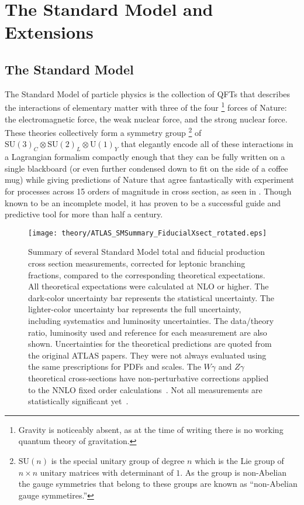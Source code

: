 \chapter{The Standard Model and Extensions}\label{chapter:theory}

\section{The Standard Model}\label{section:standard_model}

The Standard Model of particle physics is the collection of \glspl{QFT} that describes the interactions of elementary matter with three of the four%
\footnote{Gravity is noticeably absent, as at the time of writing there is no working quantum theory of gravitation.}
forces of Nature: the electromagnetic force, the weak nuclear force, and the strong nuclear force.
These theories collectively form a symmetry group%
\footnote{$\mathrm{SU}(n)$ is the special unitary group of degree $n$ which is the Lie group  of $n\times n$ unitary matrices with determinant of $1$.
 As the group is non-Abelian the gauge symmetries that belong to these groups are known as ``non-Abelian gauge symmetires.''}
of $\mathrm{SU}(3)_{C} \otimes \mathrm{SU}(2)_{L} \otimes \mathrm{U}(1)_{Y}$ that elegantly encode all of these interactions in a Lagrangian formalism compactly enough that they can be fully written on a single blackboard (or even further condensed down to fit on the side of a coffee mug) while giving predictions of Nature that agree fantastically with experiment for processes across 15 orders of magnitude in cross section, as seen in .
Though known to be an incomplete model, it has proven to be a successful guide and predictive tool for more than half a century.

\begin{figure}
 \centering
 \texttt{[image: theory/ATLAS\_SMSummary\_FiducialXsect\_rotated.eps]}
 \caption[Summary of several Standard Model total and fiducial production cross section measurements, corrected for leptonic branching fractions, compared to the corresponding theoretical expectations.]{%
  Summary of several Standard Model total and fiducial production cross section measurements, corrected for leptonic branching fractions, compared to the corresponding theoretical expectations.
  All theoretical expectations were calculated at NLO or higher.
  The dark-color uncertainty bar represents the statistical uncertainty.
  The lighter-color uncertainty bar represents the full uncertainty, including systematics and luminosity uncertainties.
  The data/theory ratio, luminosity used and reference for each measurement are also shown.
  Uncertainties for the theoretical predictions are quoted from the original ATLAS papers.
  They were not always evaluated using the same prescriptions for PDFs and scales.
  The $W\gamma$ and $Z\gamma$ theoretical cross-sections have non-perturbative corrections applied to the NNLO fixed order calculations~\cite{STDM-2011-17}.
  Not all measurements are statistically significant yet~\cite{web:ATLAS_SM_summary_plots}.}
 \label{fig:cross_section_experiment_theory}
\end{figure}

